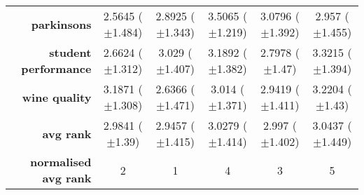 \begin{table}[htb]
{\begin{tabular}{r|ccccc}
                  \textbf{parkinsons}          & \cellcolor[rgb]{ .388,  .745,  .482}2.5645 ($\pm$1.484) & \cellcolor[rgb]{ .898,  .89,  .51}2.8925 ($\pm$1.343)   & \cellcolor[rgb]{ .973,  .412,  .42}3.5065 ($\pm$1.219)  & \cellcolor[rgb]{ .996,  .808,  .498}3.0796 ($\pm$1.392) & \cellcolor[rgb]{ 1,  .922,  .518}2.957 ($\pm$1.455)     \\
                  \textbf{student performance} & \cellcolor[rgb]{ .388,  .745,  .482}2.6624 ($\pm$1.312) & \cellcolor[rgb]{ 1,  .922,  .518}3.029 ($\pm$1.407)     & \cellcolor[rgb]{ .988,  .643,  .467}3.1892 ($\pm$1.382) & \cellcolor[rgb]{ .612,  .808,  .494}2.7978 ($\pm$1.47)  & \cellcolor[rgb]{ .973,  .412,  .42}3.3215 ($\pm$1.394)  \\
                  \textbf{wine quality}        & \cellcolor[rgb]{ .98,  .494,  .439}3.1871 ($\pm$1.308)  & \cellcolor[rgb]{ .388,  .745,  .482}2.6366 ($\pm$1.471) & \cellcolor[rgb]{ 1,  .922,  .518}3.014 ($\pm$1.371)     & \cellcolor[rgb]{ .882,  .886,  .51}2.9419 ($\pm$1.411)  & \cellcolor[rgb]{ .973,  .412,  .42}3.2204 ($\pm$1.43)   \\
                  \midrule
                  \textbf{avg rank}            & \cellcolor[rgb]{ .843,  .875,  .506}2.9841 ($\pm$1.39)  & \cellcolor[rgb]{ .388,  .745,  .482}2.9457 ($\pm$1.415) & \cellcolor[rgb]{ .984,  .588,  .455}3.0279 ($\pm$1.414) & \cellcolor[rgb]{ 1,  .922,  .518}2.997 ($\pm$1.402)     & \cellcolor[rgb]{ .973,  .412,  .42}3.0437 ($\pm$1.449)  \\
                  \midrule
                  \textbf{normalised avg rank} & \cellcolor[rgb]{ .694,  .831,  .498}2                   & \cellcolor[rgb]{ .388,  .745,  .482}1                   & \cellcolor[rgb]{ .988,  .667,  .471}4                   & \cellcolor[rgb]{ 1,  .922,  .518}3                      & \cellcolor[rgb]{ .973,  .412,  .42}5                    \\
            \end{tabular}%

      }
\end{table}%

